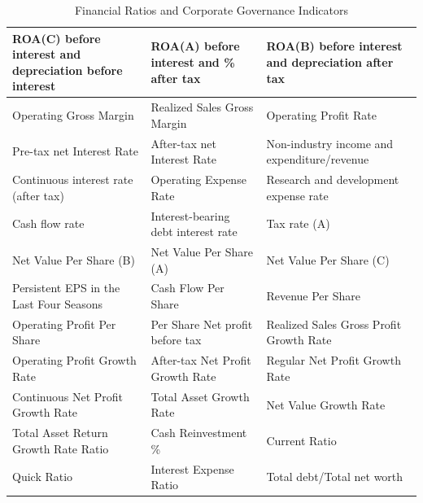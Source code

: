 \documentclass[12pt]{report}
\begin{document}
\begin{table}[H]
\caption{Financial Ratios and Corporate Governance Indicators} \label{tab:features}
\begin{adjustbox}{width=\columnwidth,center}
\begin{tabular}{|l|l|l|}
\hline
ROA(C) before interest and depreciation before interest & ROA(A) before interest and \% after tax     & ROA(B) before interest and depreciation after tax  \\ \hline
Operating Gross Margin                                  & Realized Sales Gross Margin                 & Operating Profit Rate                              \\ \hline
Pre-tax net Interest Rate                               & After-tax net Interest Rate                 & Non-industry income and expenditure/revenue        \\ \hline
Continuous interest rate (after tax)                    & Operating Expense Rate                      & Research and development expense rate              \\ \hline
Cash flow rate                                          & Interest-bearing debt interest rate         & Tax rate (A)                                       \\ \hline
Net Value Per Share (B)                                 & Net Value Per Share (A)                     & Net Value Per Share (C)                            \\ \hline
Persistent EPS in the Last Four Seasons                 & Cash Flow Per Share                         & Revenue Per Share                                  \\ \hline
Operating Profit Per Share                              & Per Share Net profit before tax             & Realized Sales Gross Profit Growth Rate            \\ \hline
Operating Profit Growth Rate                            & After-tax Net Profit Growth Rate            & Regular Net Profit Growth Rate                     \\ \hline
Continuous Net Profit Growth Rate                       & Total Asset Growth Rate                     & Net Value Growth Rate                              \\ \hline
Total Asset Return Growth Rate Ratio                    & Cash Reinvestment \%                        & Current Ratio                                      \\ \hline
Quick Ratio                                             & Interest Expense Ratio                      & Total debt/Total net worth                         \\ \hline

\end{tabular}
\end{adjustbox}
\end{table}
\end{document}

